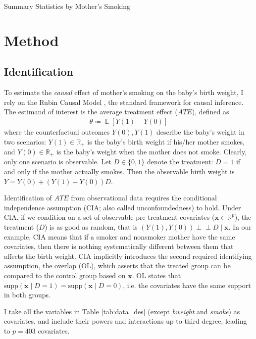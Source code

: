\documentclass[a4paper,12pt]{article}
\DeclareMathOperator*{\E}{\mathbb{E}}
\newcommand{\Eb}[1]{\E\left[#1\right]}
\newcommand{\indep}{\rotatebox[origin=c]{90}{$\models$}}
\renewcommand{\indep}{\!\perp\!\!\!\perp}
\newcommand{\ceq}{\coloneqq}  %
\newcommand{\real}{\mathbb{R}}
\newcommand{\posreal}{\mathbb{R}_+}
\newcommand{\dummy}{\{0,1\}}
\newcommand{\supp}{\text{supp}}
\begin{document}
\begin{table}[h!]
\centering
\caption{Summary Statistics by Mother's Smoking}
\label{tab:sum_stat}

\end{table}


\section{Method}

\subsection{Identification}


\noindent To estimate the \textit{causal} effect of mother's smoking on the baby's birth weight, I rely on the Rubin Causal Model \citep{rubin1974}, the standard framework for causal inference. The estimand of interest is the average treatment effect ($ATE$), defined as
\begin{align*}
\theta \ceq \Eb{Y(1)-Y(0)}
\end{align*} 
where the counterfactual outcomes $Y(0), Y(1)$ describe the baby's weight in two scenarios: $Y(1)\in\posreal$ is the baby's birth weight if his/her mother smokes, and $Y(0)\in\posreal$ is the baby's weight when the mother does not smoke. Clearly, only one scenario is observable.
Let $D\in\dummy$ denote the treatment: $D=1$ if and only if the mother actually smokes. Then the observable birth weight is $Y=Y(0)+(Y(1)-Y(0))D$.

Identification of $ATE$ from observational data requires the conditional independence assumption (CIA; also called unconfoundedness) to hold. Under CIA, if we condition on a set of observable pre-treatment covariates ($\bm{x}\in\real^p$), the treatment ($D$) is as good as random, that is $(Y(1), Y(0))\indep D \mid \bm{x}$. In our example, CIA means that if a smoker and nonsmoker mother have the same covariates, then there is nothing systematically different between them that affects the birth weight. CIA implicitly introduces the second required identifying assumption, the overlap (OL), which asserts that the treated group can be compared to the control group based on $\bm{x}$. OL states that $\supp(\bm{x}\mid D=1)=\supp(\bm{x}\mid D=0)$, i.e. the covariates have the same support in both groups. 

I take all the variables in Table \ref{tab:data_des} (except \textit{bweight} and \textit{smoke}) as covariates, and include their powers and interactions up to third degree, leading to $p=403$ covariates.
\end{document}
